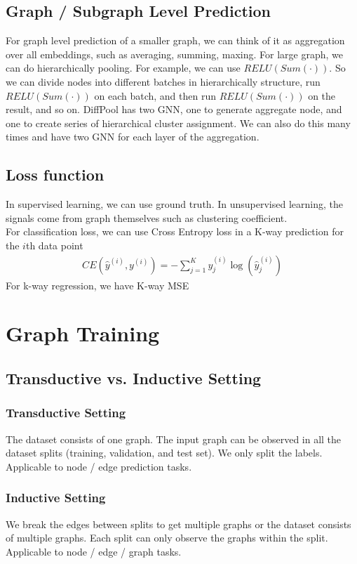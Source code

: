 \subsection{Graph / Subgraph Level Prediction}
For graph level prediction of a smaller graph, we can think of it as aggregation over all embeddings, such as averaging, summing, maxing. For large graph, we can do hierarchically pooling. For example, we can use $RELU(Sum(\cdot))$. So we can divide nodes into different batches in hierarchically structure, run  $RELU(Sum(\cdot))$ on each batch, and then run $RELU(Sum(\cdot))$ on the result, and so on. DiffPool has two GNN, one to generate aggregate node, and one to create series of hierarchical cluster assignment. We can also do this many times and have two GNN for each layer of the aggregation. 


\subsection{Loss function} 
In supervised learning, we can use ground truth. In unsupervised learning, the signals come from graph themselves such as clustering coefficient. \\
For classification loss, we can use Cross Entropy loss in a K-way prediction for the $i$th data point 
    \begin{align*}
        CE(\hat{y}^{(i)}, y^{(i)}) = -\sum_{j=1}^K y_j^{(i)} \log (\hat{y}_j^{(i)})
    \end{align*}
For k-way regression, we have K-way MSE


\section{Graph Training} 

\subsection{Transductive vs. Inductive Setting}

\subsubsection{Transductive Setting}
The dataset consists of one graph. The input graph can be observed in all the dataset splits (training, validation, and test set). We only split the labels. Applicable to node / edge prediction tasks. 

\subsubsection{Inductive Setting} 
We break the edges between splits to get multiple graphs or the dataset consists of multiple graphs. Each split can only observe the graphs within the split. Applicable to node / edge / graph tasks. 


